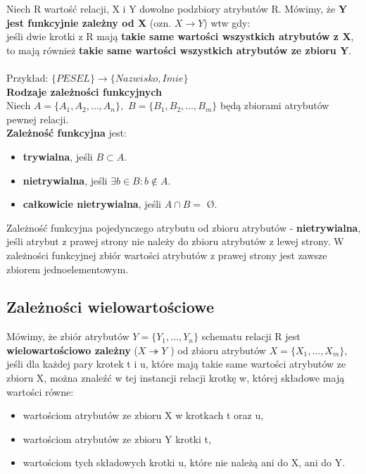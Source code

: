 \documentclass[a4paper]{article}
\begin{document}
Niech R wartość relacji, X i Y dowolne podzbiory atrybutów R. Mówimy, że \textbf{Y jest funkcyjnie zależny od X} (ozn. $X \rightarrow Y$) wtw gdy: \\
jeśli dwie krotki z R mają \textbf{takie same wartości wszystkich atrybutów z X}, to mają również \textbf{takie same wartości wszystkich atrybutów ze zbioru Y}.\\\\
Przykład:
$\{PESEL\} \longrightarrow \{Nazwisko, Imie\}$\\

\textbf{Rodzaje zależności funkcyjnych}\\
Niech $A = \{A_1, A_2,\dots, A_n\},$ $B = \{B_1, B_2, \dots, B_m\}$ będą zbiorami atrybutów pewnej relacji.\\
\textbf{Zależność funkcyjna} jest:
\begin{itemize}
    \item \textbf{trywialna}, jeśli $B \subset A$.
    \item \textbf{nietrywialna}, jeśli $\exists b \in B : b \notin A$.
    \item \textbf{całkowicie nietrywialna}, jeśli $A \cap B =$  \O.
\end{itemize}

Zależność funkcyjna pojedynczego atrybutu od zbioru atrybutów - \textbf{nietrywialna}, jeśli atrybut z prawej strony nie należy do zbioru atrybutów z lewej strony. W zależności funkcyjnej zbiór wartości atrybutów z prawej strony jest zawsze zbiorem jednoelementowym.\\

\subsection{Zależności wielowartościowe}
Mówimy, że zbiór atrybutów $Y=\{Y_1, \dots ,Y_n\}$ schematu relacji R jest \textbf{wielowartościowo zależny} ($ X \twoheadrightarrow Y$ ) od zbioru atrybutów $X=\{X_1,\dots,X_m\}$, jeśli dla każdej pary krotek t i u, które mają takie same wartości atrybutów ze zbioru X, można znaleźć w tej instancji relacji krotkę w, której składowe mają wartości równe:
\begin{itemize}
    \item wartościom atrybutów ze zbioru X w krotkach t oraz u,
    \item wartościom atrybutów ze zbioru Y krotki t,
    \item wartościom tych składowych krotki u, które nie należą ani do X, ani do Y.
\end{itemize}
\end{document}

